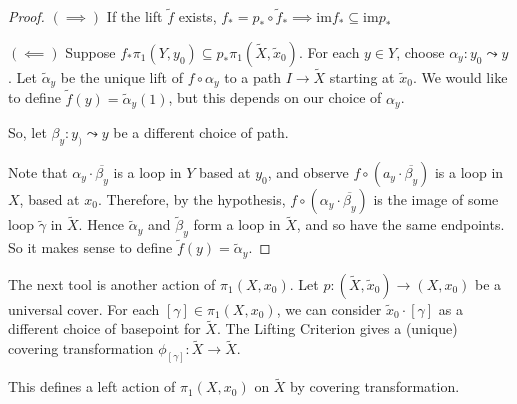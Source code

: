 \documentclass{article}
\numberwithin{nthm}{subsection}
\begin{document}

\begin{proof}
    $(\implies)$ If the lift $\widetilde{f}$ exists, $f_* = p_* \circ \widetilde{f}_* \implies \mathrm{im} f_* \subseteq \mathrm{im} p_*$

    $(\impliedby)$ Suppose $f_* \pi_1(Y, y_0) \subseteq p_* \pi_1 (\widetilde{X}, \widetilde{x}_0)$. For each $y \in Y$, choose $\alpha_y: y_0 \leadsto y$.
    Let $\widetilde{\alpha}_y$ be the unique lift of $f \circ \alpha_y$ to a path $I \to \widetilde{X}$ starting at $\widetilde{x}_0$.
    We would like to define $\widetilde{f}(y) = \widetilde{\alpha}_y(1)$, but this depends on our choice of $\alpha_y$.

    So, let $\beta_y : y_) \leadsto y$ be a different choice of path.

    Note that $\alpha_y \cdot \overline{\beta_y}$ is a loop in $Y$ based at $y_0$, and observe $f \circ (a_y \cdot \overline{\beta_y})$ is a loop in $X$, based at $x_0$. Therefore, by the hypothesis, $f \circ (\alpha_y \cdot \overline{\beta_y})$ is the image of some loop $\widetilde{\gamma}$ in $\widetilde{X}$. Hence $\widetilde{\alpha}_y$ and $\widetilde{\beta}_y$ form a loop in $\widetilde{X}$, and so have the same endpoints. So it makes sense to define $\widetilde{f}(y) = \widetilde{\alpha}_y$.
\end{proof}

The next tool is another action of $\pi_1(X, x_0)$.
Let $p : (\widetilde{X}, \widetilde{x}_0) \to (X, x_0)$ be a universal cover. For each $[\gamma] \in \pi_1(X, x_0)$, we can consider $\widetilde{x}_0 \cdot [\gamma]$ as a different choice of basepoint for $\widetilde{X}$.
The Lifting Criterion gives a (unique) covering transformation $\phi_{[\gamma]} : \widetilde{X} \to \widetilde{X}$.

\begin{lemma}
    This defines a left action of $\pi_1(X, x_0)$ on $\widetilde{X}$ by covering transformation.
\end{lemma}
\end{document}
